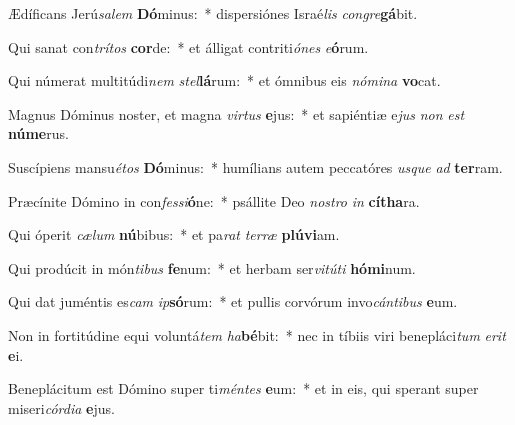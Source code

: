 \item Ædíficans Jerú\textit{sa}\textit{lem} \textbf{Dó}minus:~* dispersiónes Israé\textit{lis} \textit{con}\textit{gre}\textbf{gá}bit.
\item Qui sanat con\textit{trí}\textit{tos} \textbf{cor}de:~* et álligat contriti\textit{ó}\textit{nes} \textit{e}\textbf{ó}rum.
\item Qui númerat multitúdi\textit{nem} \textit{stel}\textbf{lá}rum:~* et ómnibus eis \textit{nó}\textit{mi}\textit{na} \textbf{vo}cat.
\item Magnus Dóminus noster, et magna \textit{vir}\textit{tus} \textbf{e}jus:~* et sapiéntiæ e\textit{jus} \textit{non} \textit{est} \textbf{nú}\textbf{me}rus.
\item Suscípiens mansu\textit{é}\textit{tos} \textbf{Dó}minus:~* humílians autem peccatóres \textit{us}\textit{que} \textit{ad} \textbf{ter}ram.
\item Præcínite Dómino in con\textit{fes}\textit{si}\textbf{ó}ne:~* psállite Deo \textit{nos}\textit{tro} \textit{in} \textbf{cí}\textbf{tha}ra.
\item Qui óperit \textit{cæ}\textit{lum} \textbf{nú}bibus:~* et pa\textit{rat} \textit{ter}\textit{ræ} \textbf{plú}\textbf{vi}am.
\item Qui prodúcit in món\textit{ti}\textit{bus} \textbf{fe}num:~* et herbam ser\textit{vi}\textit{tú}\textit{ti} \textbf{hó}\textbf{mi}num.
\item Qui dat juméntis es\textit{cam} \textit{ip}\textbf{só}rum:~* et pullis corvórum invo\textit{cán}\textit{ti}\textit{bus} \textbf{e}um.
\item Non in fortitúdine equi voluntá\textit{tem} \textit{ha}\textbf{bé}bit:~* nec in tíbiis viri benepláci\textit{tum} \textit{e}\textit{rit} \textbf{e}i.
\item Beneplácitum est Dómino super ti\textit{mén}\textit{tes} \textbf{e}um:~* et in eis, qui sperant super miseri\textit{cór}\textit{di}\textit{a} \textbf{e}jus.
